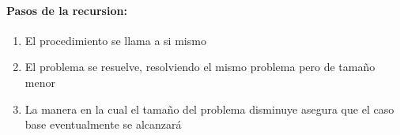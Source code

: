 \documentclass[10pt]{article}
\begin{document}
\paragraph{Pasos de la recursion:}
\begin{enumerate}
	\item El procedimiento se llama a si mismo
	\item El problema se resuelve, resolviendo el mismo problema pero de tamaño menor
	\item La manera en la cual el tamaño del problema disminuye asegura que el caso base eventualmente se alcanzará
\end{enumerate}
\end{document}
